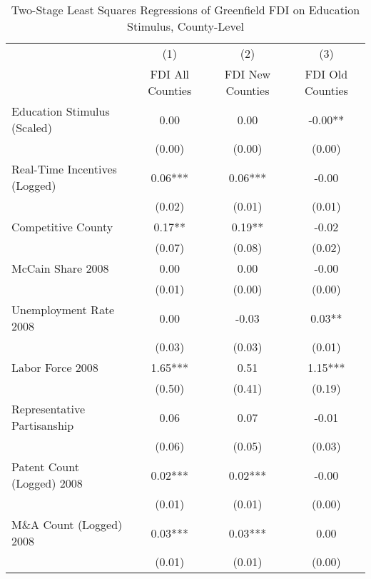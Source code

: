 \begin{table}[!htbp]\centering
\def\sym#1{\ifmmode^{#1}\else\(^{#1}\)\fi}
\caption{Two-Stage Least Squares Regressions of Greenfield FDI on Education Stimulus, County-Level}
\begin{tabular}{l*{3}{c}}
\hline\hline
                    &\multicolumn{1}{c}{(1)}   &\multicolumn{1}{c}{(2)}   &\multicolumn{1}{c}{(3)}   \\
                    &FDI All Counties   &FDI New Counties   &FDI Old Counties   \\
\hline
Education Stimulus (Scaled)&        0.00   &        0.00   &       -0.00** \\
                    &      (0.00)   &      (0.00)   &      (0.00)   \\
Real-Time Incentives (Logged)&        0.06***&        0.06***&       -0.00   \\
                    &      (0.02)   &      (0.01)   &      (0.01)   \\
Competitive County  &        0.17** &        0.19** &       -0.02   \\
                    &      (0.07)   &      (0.08)   &      (0.02)   \\
McCain Share 2008   &        0.00   &        0.00   &       -0.00   \\
                    &      (0.01)   &      (0.00)   &      (0.00)   \\
Unemployment Rate 2008 &        0.00   &       -0.03   &        0.03** \\
                    &      (0.03)   &      (0.03)   &      (0.01)   \\
Labor Force 2008    &        1.65***&        0.51   &        1.15***\\
                    &      (0.50)   &      (0.41)   &      (0.19)   \\
Representative Partisanship&        0.06   &        0.07   &       -0.01   \\
                    &      (0.06)   &      (0.05)   &      (0.03)   \\
Patent Count (Logged) 2008&        0.02***&        0.02***&       -0.00   \\
                    &      (0.01)   &      (0.01)   &      (0.00)   \\
M\&A Count (Logged) 2008&        0.03***&        0.03***&        0.00   \\
                    &      (0.01)   &      (0.01)   &      (0.00)   \\

\end{tabular}
\end{table}
